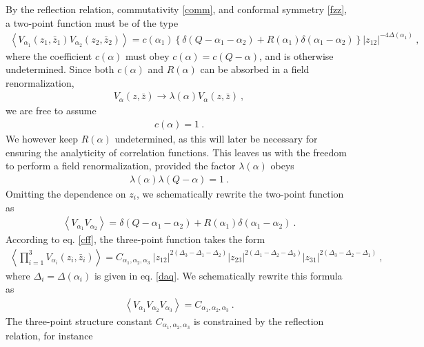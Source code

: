 \documentclass[12pt,a4paper,notitlepage]{report}
\numberwithin{equation}{section}
\theoremstyle{break}
\begin{document}
By the reflection relation, commutativity \eqref{comm}, and conformal symmetry \eqref{fzz}, a two-point function must be of the type 
\begin{align}
 \left\langle V_{\alpha_1}(z_1,\bar{z}_1) V_{\alpha_2}(z_2,\bar{z}_2)\right\rangle = c(\alpha_1) \left\{ \delta(Q-\alpha_1-\alpha_2) + R(\alpha_1)\delta(\alpha_1-\alpha_2)\right\} |z_{12}|^{-4\Delta(\alpha_1)}\ , 
\label{vvc}
\end{align}
where the coefficient $c(\alpha)$ must obey $c(\alpha)=c(Q-\alpha)$, and is otherwise undetermined.
Since both $c(\alpha)$ and $R(\alpha)$ can be absorbed in a field renormalization, 
\begin{align}
 V_\alpha(z,\bar{z}) \rightarrow \lambda(\alpha)  V_\alpha(z,\bar{z}) \ ,
\label{vlv}
\end{align}
we are free to assume
\begin{align}
 c(\alpha)=1\ .
\end{align}
We however keep $R(\alpha)$ undetermined, as this will later be necessary for ensuring the analyticity of correlation functions.
This leaves us with the freedom to perform a field renormalization, provided the factor $\lambda(\alpha)$ obeys
\begin{align}
 \lambda(\alpha)\lambda(Q-\alpha) = 1\ .
\label{llo}
\end{align}
Omitting the dependence on $z_i$, we schematically rewrite the two-point function as 
\begin{align}
 \boxed{\left\langle V_{\alpha_1}V_{\alpha_2} \right\rangle = \delta(Q-\alpha_1-\alpha_2) + R(\alpha_1)\delta(\alpha_1-\alpha_2) }\ .
\label{vvss}
\end{align}
According to eq. \eqref{cff}, the three-point function takes the form
\begin{align}
\left\langle \prod_{i=1}^3 V_{\alpha_i}(z_i,\bar{z}_i)\right\rangle = C_{\alpha_1,\alpha_2,\alpha_3}\ |z_{12}|^{2(\Delta_3-\Delta_1-\Delta_2)} |z_{23}|^{2(\Delta_1-\Delta_2-\Delta_3)} |z_{31}|^{2(\Delta_3-\Delta_2-\Delta_1)}\ ,
\label{vvv}
\end{align}
where $\Delta_i = \Delta(\alpha_i)$ is given in eq. \eqref{daq}.
We schematically rewrite this formula as 
\begin{align}
 \boxed{ \left\langle V_{\alpha_1}V_{\alpha_2}V_{\alpha_3} \right\rangle = C_{\alpha_1,\alpha_2,\alpha_3} }\ .
\label{vvvs}
\end{align}
The three-point structure constant $C_{\alpha_1,\alpha_2,\alpha_3}$ is constrained by the reflection relation, for instance
\end{document}
